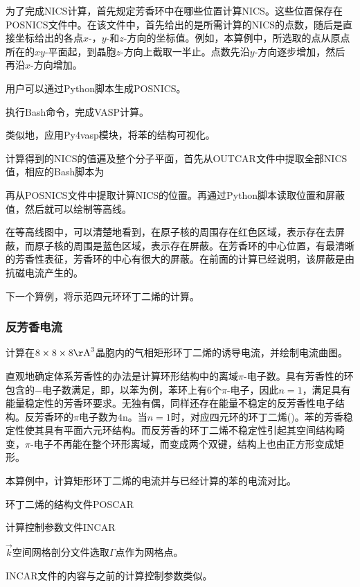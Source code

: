 为了完成\textrm{NICS}计算，首先规定芳香环中在哪些位置计算\textrm{NICS}。这些位置保存在\textrm{POSNICS}文件中。在该文件中，首先给出的是所需计算的\textrm{NICS}的点数，随后是直接坐标给出的各点$x$-，$y$-和$z$-方向的坐标值。例如，本算例中，所选取的点从原点所在的$xy$-平面起，到晶胞$z$-方向上截取一半止。点数先沿$y$-方向逐步增加，然后再沿$x$-方向增加。

用户可以通过\textrm{Python}脚本生成\textrm{POSNICS}。

执行\textrm{Bash}命令，完成\textrm{VASP}计算。

类似地，应用\textrm{Py4vasp}模块，将苯的结构可视化。

计算得到的\textrm{NICS}的值遍及整个分子平面，首先从\textrm{OUTCAR}文件中提取全部\textrm{NICS}值，相应的\textrm{Bash}脚本为

再从\textrm{POSNICS}文件中提取计算\textrm{NICS}的位置。再通过\textrm{Python}脚本读取位置和屏蔽值，然后就可以绘制等高线。

在等高线图中，可以清楚地看到，在原子核的周围存在红色区域，表示存在去屏蔽，而原子核的周围是蓝色区域，表示存在屏蔽。在芳香环的中心位置，有最清晰的芳香性表征，芳香环的中心有很大的屏蔽。在前面的计算已经说明，该屏蔽是由抗磁电流产生的。

下一个算例，将示范四元环环丁二烯的计算。

\subsubsection{反芳香电流}
计算在$8\times8\times8\mathrm{\AA}^3$晶胞内的气相矩形环丁二烯的诱导电流，并绘制电流曲图。

直观地确定体系芳香性的办法是计算环形结构中的离域$\pi$-电子数。具有芳香性的环包含的\pi$-电子数满足$，即，以苯为例，苯环上有6个$\pi$-电子，因此$n=1$，满足具有能量稳定性的芳香环要求。无独有偶，同样还存在能量不稳定的反芳香性电子结构。反芳香环的$\pi$电子数为$\mathrm{4n}$。当$n=1$时，对应四元环的环丁二烯()。苯的芳香稳定性使其具有平面六元环结构。而反芳香的环丁二烯不稳定性引起其空间结构畸变，$\pi$-电子不再能在整个环形离域，而变成两个双键，结构上也由正方形变成矩形。

本算例中，计算矩形环丁二烯的电流并与已经计算的苯的电流对比。

环丁二烯的结构文件\textrm{POSCAR}

计算控制参数文件\textrm{INCAR}

$\vec k$空间网格剖分文件选取$\Gamma$点作为网格点。

\textrm{INCAR}文件的内容与之前的计算控制参数类似。

